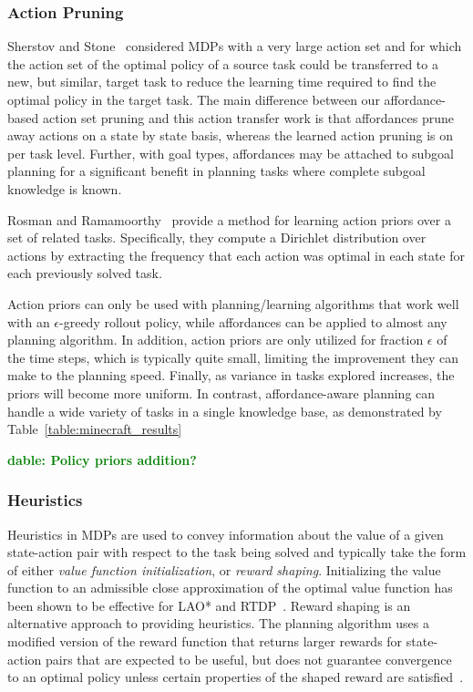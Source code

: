 \documentclass[letterpaper]{article}
\newcommand{\dnote}[1]{\textcolor{Green}{\textbf{dable:  #1}}}
\begin{document}
\subsubsection{Action Pruning}

Sherstov and Stone~\cite{sherstov2005improving} considered MDPs with a
very large action set and for which the action set of the optimal
policy of a source task could be transferred to a new, but similar,
target task to reduce the learning time required to find the optimal
policy in the target task. The main difference between our
affordance-based action set pruning and this action transfer work is
that affordances prune away actions on a state by state basis, whereas
the learned action pruning is on per task level. Further, with goal
types, affordances may be attached to subgoal planning for a
significant benefit in planning tasks where complete subgoal knowledge
is known.

Rosman and Ramamoorthy~\cite{rosman2012good} provide a method for learning action
priors over a set of related tasks. Specifically, they compute a Dirichlet distribution over 
actions by extracting the frequency that each action was optimal in each state for each 
previously solved task.

Action priors can only be used with planning/learning algorithms that
work well with an $\epsilon$-greedy rollout policy, while affordances
can be applied to almost any planning algorithm.  In addition, action
priors are only utilized for fraction $\epsilon$ of the time steps,
which is typically quite small, limiting the improvement they can make
to the planning speed.  Finally, as variance in tasks explored
increases, the priors will become more uniform. In contrast,
affordance-aware planning can handle a wide variety of tasks in a
single knowledge base, as demonstrated by
Table~\ref{table:minecraft_results}

\dnote{Policy priors addition?}

\subsubsection{Heuristics}
Heuristics in MDPs are used to convey information about the value of a
given state-action pair with respect to the task being solved and
typically take the form of either {\em value function initialization},
or {\em reward shaping}. Initializing the value function to an
admissible close approximation of the optimal value function has been
shown to be effective for LAO* and RTDP~\cite{Hansen:1999qf}.  Reward
shaping is an alternative approach to providing heuristics. The
planning algorithm uses a modified version of the reward function that
returns larger rewards for state-action pairs that are expected to be
useful, but does not guarantee convergence to an optimal policy unless
certain properties of the shaped reward are satisfied~\cite{potshap}.
\end{document}
